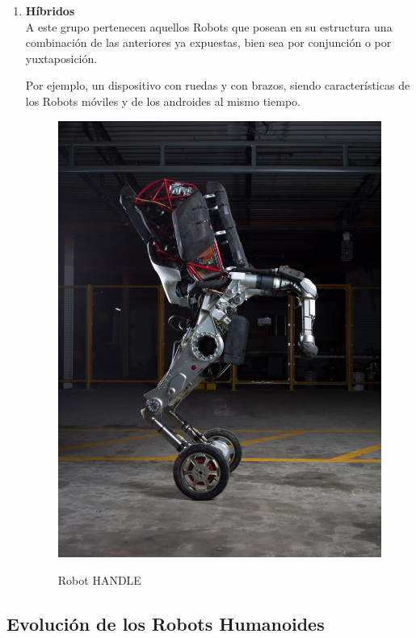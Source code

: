 \begin{enumerate}
\item \textbf{Híbridos}\\ A este grupo pertenecen aquellos Robots que posean en su estructura una combinación de las anteriores ya expuestas, bien sea por conjunción o por yuxtaposición. 

Por ejemplo, un dispositivo con ruedas y con brazos, siendo características de los Robots móviles y de los androides al mismo tiempo.

\begin{figure}[H]
\centering
{\includegraphics[scale=0.15]{imagenes/apartado_2/25_hibrido_handle_bd}}
\caption{Robot HANDLE \cite{ref35}}
\label{figura25}
\end{figure}

\end{enumerate}

\newpage

\subsection{Evolución de los Robots Humanoides}\label{historia_robots_humanoides}

